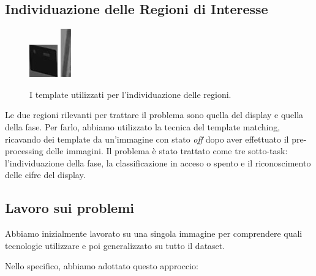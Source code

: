\documentclass{article}
\begin{document}
\subsection{Individuazione delle Regioni di
Interesse}\label{individuazione-delle-regioni-di-interesse}

\begin{figure}[h!]
  \centering
  \includegraphics[scale=2]{display_template}
  \includegraphics[scale=0.5]{template_bar}
  \caption{I template utilizzati per l'individuazione delle regioni.}
\end{figure}

\par Le due regioni rilevanti per trattare il problema sono quella del
display e quella della fase. Per farlo, abbiamo utilizzato la tecnica
del template matching\citep{jain2000statistical}\citep{hart2000pattern}, ricavando dei template da un'immagine con stato
\textit{off} dopo aver effettuato il pre-processing delle immagini. Il
problema è stato trattato come tre sotto-task: l'individuazione della fase,
la classificazione in acceso o spento e il riconoscimento delle cifre del display.

\subsection{Lavoro sui problemi}\label{lavoro-sui-problemi}

\par Abbiamo inizialmente lavorato su una singola immagine per comprendere
quali tecnologie utilizzare e poi generalizzato su tutto il dataset.
\par Nello specifico, abbiamo adottato questo approccio:
\end{document}
